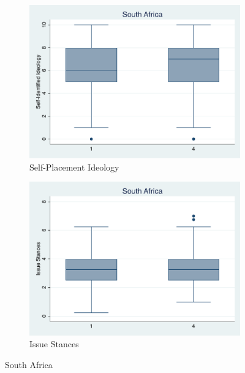 \documentclass[12pt, titlepage]{article}
\begin{document}
\begin{figure}[H]
	\centering
	\begin{subfigure}[b]{0.475\textwidth}   
		\centering 
		\includegraphics[width=\textwidth]{IdeoBP/SouthAfrica}
		\caption{Self-Placement Ideology}
	\end{subfigure}
	\hfill
	\begin{subfigure}[b]{0.475\textwidth}
		\centering 
		\includegraphics[width=\textwidth]{BoxLib/SAfrica}
		\caption{Issue Stances}
	\end{subfigure}
	\caption{South Africa}
	\label{SouthAfrica}
\end{figure}
\end{document}
